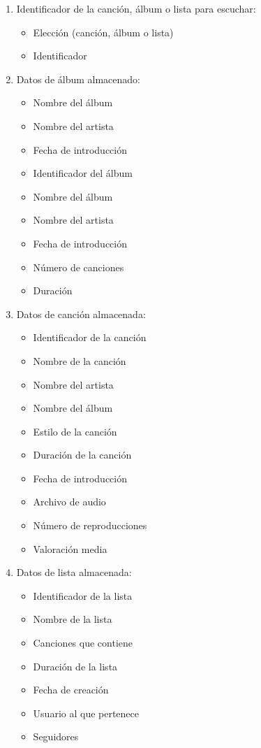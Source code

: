 \documentclass[12pt,a4paper]{article}
\begin{document}
\begin{enumerate}[label=\textnormal{RD\arabic*}]

	\item Identificador de la canción, álbum o lista para escuchar: \label{rd1}
		\begin{itemize}
			\item Elección (canción, álbum o lista)
			\item Identificador
		\end{itemize}
		
	\item Datos de álbum almacenado: \label{rd2}
		\begin{itemize}
			\item Nombre del álbum
			\item Nombre del artista
			\item Fecha de introducción
			\item Identificador del álbum
        	\item Nombre del álbum
		    \item Nombre del artista
		    \item Fecha de introducción
			\item Número de canciones
			\item Duración
		\end{itemize}
		
		
	\item Datos de canción almacenada: \label{rd3}
		\begin{itemize}
			\item Identificador de la canción
		    \item Nombre de la canción
		    \item Nombre del artista
		    \item Nombre del álbum
		    \item Estilo de la canción
		    \item Duración de la canción
		    \item Fecha de introducción
		    \item Archivo de audio
		    \item Número de reproducciones
		    \item Valoración media
		\end{itemize}
		
	\item Datos de lista almacenada: \label{rd4}
		\begin{itemize}
		    \item Identificador de la lista
		    \item Nombre de la lista
		    \item Canciones que contiene
		    \item Duración de la lista
		    \item Fecha de creación
		    \item Usuario al que pertenece
		    \item Seguidores
		\end{itemize}
		

\end{enumerate}
\end{document}
